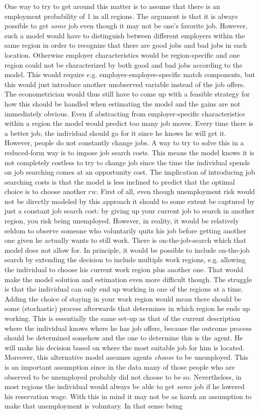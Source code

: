 One way to try to get around this matter is to assume that there is an employment probability of 1 in all regions. The argument is that it is always possible to get \textit{some} job even though it may not be one's favorite job. However, such a model would have to distinguish between different employers within the same region in order to recognize that there are good jobs and bad jobs in each location. Otherwise employer characteristics would be region-specific and one region could not be characterized by both good and bad jobs according to the model.  This would require e.g. employer-employee-specific match components, but this would just introduce another unobserved variable instead of the job offers. The econometrician would thus still have to come up with a feasible strategy for how this should be handled when estimating the model and the gains are not immediately obvious. Even if abstracting from employer-specific characteristics within a region the model would predict too many job moves. Every time there is a better job, the individual should go for it since he knows he will get it. However, people do not constantly change jobs. A way to try to solve this in a reduced-form way is to impose job search costs. This means the model knows it is not completely costless to try to change job since the time the individual spends on job searching comes at an opportunity cost. The implication of introducing job searching costs is that the model is less inclined to predict that the optimal choice is to choose another $rw$. First of all, even though unemployment risk would not be directly modeled by this approach it should to some extent be captured by just a constant job search cost: by giving up your current job to search in another region, you risk being unemployed. However, in reality, it would be relatively seldom to observe someone who voluntarily quits his job before getting another one given he actually wants to still work. There is on-the-job-search which that model does not allow for. In principle, it would be possible to include on-the-job search by extending the decision to include multiple work regions, e.g. allowing the individual to choose his current work region plus another one. That would make the model solution and estimation even more difficult though. The struggle is that the individual can only end up working in one of the regions at a time. Adding the choice of staying in your work region would mean there should be some (stochastic) process afterwards that determines in which region he ends up working. This is essentially the same set-up as that of the current description where the individual knows where he has job offers, because the outcome process should be determined somehow and the one to determine this is the agent. He will make his decision based on where the most suitable job for him is located. Moreover, this alternative model assumes agents \textit{choose} to be unemployed. This is an important assumption since in the data many of those people who are observed to be unemployed probably did not choose to be so. Nevertheless, in most regions the individual would always be able to get \textit{some} job if he lowered his reservation wage. With this in mind it may not be as harsh an assumption to make that unemployment is voluntary. In that sense being 